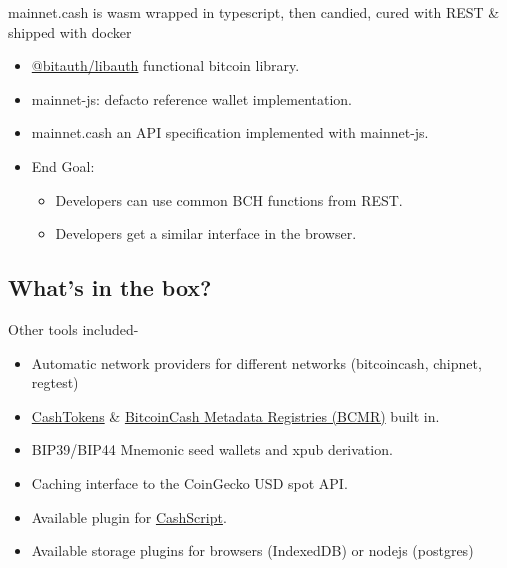 \documentclass{beamer}
\begin{document}
\begin{frame}{mainnet.cash is wasm wrapped in typescript, then candied, cured with REST \& shipped with docker}{}

  
  \begin{itemize}
  \item
    \href{https://libauth.org/}{@bitauth/libauth} functional bitcoin library.
  \item
    mainnet-js: defacto reference wallet implementation. 
  \item
    mainnet.cash an API specification implemented with mainnet-js.
    \item
        End Goal:
        \begin{itemize}
        \item
        Developers can use common BCH functions from REST.
        \item
        Developers get a similar interface in the browser. 
        \end{itemize}
  \end{itemize}
  
\end{frame}
\subsection[Batteries included]{What's in the box?}

\begin{frame}{Other tools included}{-}
  \begin{itemize}
    \item
      Automatic network providers for different networks (bitcoincash, chipnet, regtest)
    \item
      \href{https://github.com/bitjson/cashtokens}{CashTokens} \& \href{https://github.com/bitjson/chip-bcmr}{BitcoinCash Metadata Registries (BCMR)} built in.
    \item
      BIP39/BIP44 Mnemonic seed wallets and xpub derivation.   
    \item
      Caching interface to the CoinGecko USD spot API.
    \item
      Available plugin for \href{https://cashscript.org/}{CashScript}.
    \item
      Available storage plugins for browsers (IndexedDB) or nodejs (postgres)
    \end{itemize}
\end{frame}
\end{document}
